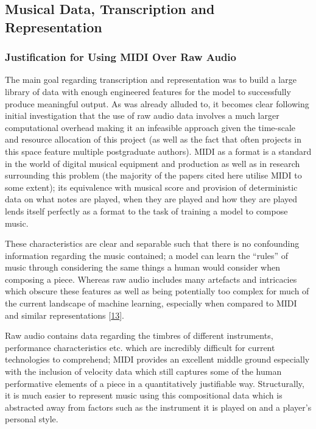 \documentclass[12pt,]{article}
\begin{document}
\hypertarget{musical-data-transcription-and-representation}{%
\subsection{Musical Data, Transcription and
Representation}\label{musical-data-transcription-and-representation}}

\hypertarget{justification-for-using-midi-over-raw-audio}{%
\subsubsection{Justification for Using MIDI Over Raw
Audio}\label{justification-for-using-midi-over-raw-audio}}

The main goal regarding transcription and representation was to build a
large library of data with enough engineered features for the model to
successfully produce meaningful output. As was already alluded to, it
becomes clear following initial investigation that the use of raw audio
data involves a much larger computational overhead making it an
infeasible approach given the time-scale and resource allocation of this
project (as well as the fact that often projects in this space feature
multiple postgraduate authors). MIDI as a format is a standard in the
world of digital musical equipment and production as well as in research
surrounding this problem (the majority of the papers cited here utilise
MIDI to some extent); its equivalence with musical score and provision
of deterministic data on what notes are played, when they are played and
how they are played lends itself perfectly as a format to the task of
training a model to compose music.

These characteristics are clear and separable such that there is no
confounding information regarding the music contained; a model can learn
the ``rules'' of music through considering the same things a human would
consider when composing a piece. Whereas raw audio includes many
artefacts and intricacies which obscure these features as well as being
potentially too complex for much of the current landscape of machine
learning, especially when compared to MIDI and similar representations
{[}\protect\hyperlink{ref-dai2018music}{13}{]}.

Raw audio contains data regarding the timbres of different instruments,
performance characteristics etc. which are incredibly difficult for
current technologies to comprehend; MIDI provides an excellent middle
ground especially with the inclusion of velocity data which still
captures some of the human performative elements of a piece in a
quantitatively justifiable way. Structurally, it is much easier to
represent music using this compositional data which is abstracted away
from factors such as the instrument it is played on and a player's
personal style.
\end{document}
